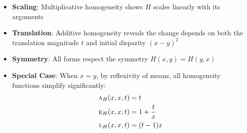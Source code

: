 \documentclass{amsart}
\theoremstyle{plain}
\numberwithin{equation}{section}
\newcommand{\eh}{\textsc{e}}
\begin{document}
\begin{itemize}
\item \textbf{Scaling}: Multiplicative homogeneity shows $H$ scales linearly with its arguments
\item \textbf{Translation}: Additive homogeneity reveals the change depends on both the translation magnitude $t$ and initial disparity $(x-y)^2$
\item \textbf{Symmetry}: All forms respect the symmetry $H(x,y) = H(y,x)$
\item \textbf{Special Case}: When $x=y$, by reflexivity of means, all homogeneity functions simplify significantly:
\begin{align*}
\textsc{a}_H(x,x,t) &= t \\
\eh_H(x,x,t) &= 1 + \frac{t}{x} \\
\textsc{l}_H(x,x,t) &= (t-1)x
\end{align*}
\end{itemize}
\end{document}
